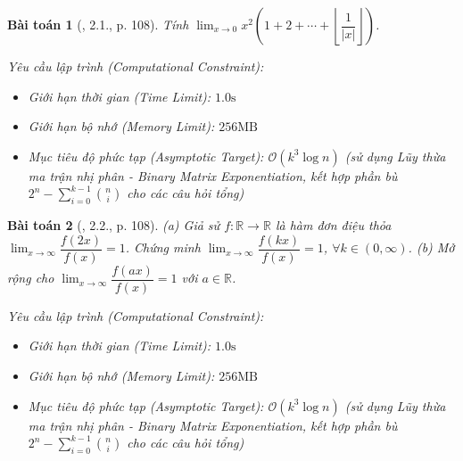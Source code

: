 \documentclass{article}
\newtheorem{baitoan}{Bài toán}
\begin{document}
\begin{baitoan}[\cite{Quoc_Long_Dat_Nam_VMC}, 2.1., p. 108]
	Tính $\lim_{x\to0} x^2\left(1 + 2 + \cdots + \left\lfloor\dfrac{1}{|x|}\right\rfloor\right)$.

    \vspace{0.5em}
    \emph{Yêu cầu lập trình (Computational Constraint):}
    \begin{itemize}
        \item Giới hạn thời gian (Time Limit): $1.0\mathrm{s}$
        \item Giới hạn bộ nhớ (Memory Limit): $256\mathrm{MB}$
        \item Mục tiêu độ phức tạp (Asymptotic Target): $\mathcal{O}(k^3 \log n)$ (sử dụng Lũy thừa ma trận nhị phân - Binary Matrix Exponentiation, kết hợp phần bù $2^n - \sum_{i=0}^{k-1} \binom{n}{i}$ cho các câu hỏi tổng)
    \end{itemize}
\end{baitoan}


\begin{baitoan}[\cite{Quoc_Long_Dat_Nam_VMC}, 2.2., p. 108]
	(a) Giả sử $f:\mathbb{R}\to\mathbb{R}$ là hàm đơn điệu thỏa $\lim_{x\to\infty} \dfrac{f(2x)}{f(x)} = 1$. Chứng minh $\lim_{x\to\infty} \dfrac{f(kx)}{f(x)} = 1$, $\forall k\in(0,\infty)$. (b) Mở rộng cho $\lim_{x\to\infty} \dfrac{f(ax)}{f(x)} = 1$ với $a\in\mathbb{R}$.

    \vspace{0.5em}
    \emph{Yêu cầu lập trình (Computational Constraint):}
    \begin{itemize}
        \item Giới hạn thời gian (Time Limit): $1.0\mathrm{s}$
        \item Giới hạn bộ nhớ (Memory Limit): $256\mathrm{MB}$
        \item Mục tiêu độ phức tạp (Asymptotic Target): $\mathcal{O}(k^3 \log n)$ (sử dụng Lũy thừa ma trận nhị phân - Binary Matrix Exponentiation, kết hợp phần bù $2^n - \sum_{i=0}^{k-1} \binom{n}{i}$ cho các câu hỏi tổng)
    \end{itemize}
\end{baitoan}
\end{document}
